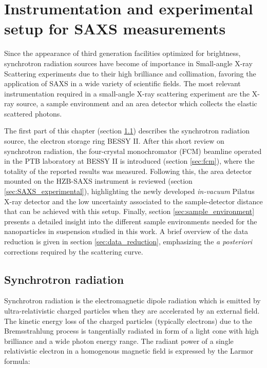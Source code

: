 \chapter{Instrumentation and experimental setup for SAXS measurements}
\label{chap:experimental_setup}

Since the appearance of third generation facilities optimized for brightness, synchrotron radiation sources have become of importance in Small-angle X-ray Scattering experiments due to their high brilliance and collimation, favoring the application of SAXS in a wide variety of scientific fields. The most relevant instrumentation required in a small-angle X-ray scattering experiment are the X-ray source, a sample environment and an area detector which collects the elastic scattered photons. 

The first part of this chapter (section \ref{sec:BESSY}) describes the synchrotron radiation source, the electron storage ring BESSY II. After this short review on synchrotron radiation, the four-crystal monochromator (FCM) beamline operated in the PTB laboratory at BESSY II is introduced (section \ref{sec:fcm}), where the totality of the reported results was measured. Following this, the area detector mounted on the HZB-SAXS instrument is reviewed (section \ref{sec:SAXS_experimental}), highlighting the newly developed \emph{in-vacuum} Pilatus X-ray detector and the low uncertainty associated to the sample-detector distance that can be achieved with this setup. Finally, section \ref{sec:sample_environment} presents a detailed insight into the different sample environments needed for the nanoparticles in suspension studied in this work. A brief overview of the data reduction is given in section \ref{sec:data_reduction}, emphasizing the \emph{a posteriori} corrections required by the scattering curve.


\section{Synchrotron radiation}
\label{sec:BESSY}

Synchrotron radiation is the electromagnetic dipole radiation which is emitted by ultra-relativistic charged particles when they are accelerated by an external field. The kinetic energy loss of the charged particles (typically electrons) due to the Bremsstrahlung process \citep{blumenthal_bremsstrahlung_1970} is tangentially radiated in form of a light cone with high brilliance and a wide photon energy range. The radiant power of a single relativistic electron in a homogenous magnetic field is expressed by the Larmor formula:

